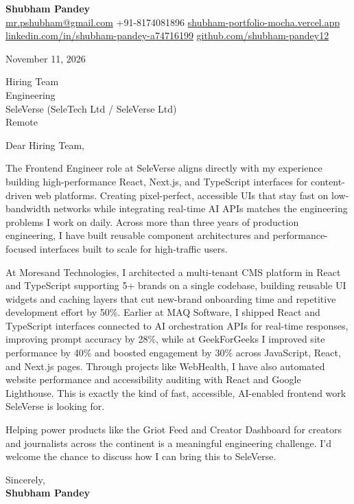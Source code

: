 \documentclass[a4paper,11pt]{article}
\begin{document}
\textbf{\Large Shubham Pandey}\\
\href{mailto:mr.pshubham@gmail.com}{mr.pshubham@gmail.com} \quad +91-8174081896 \quad
\href{https://shubham-portfolio-mocha.vercel.app/}{shubham-portfolio-mocha.vercel.app}\\
\href{https://www.linkedin.com/in/shubham-pandey-a74716199/}{linkedin.com/in/shubham-pandey-a74716199} \quad
\href{https://github.com/shubham-pandey12}{github.com/shubham-pandey12}

\vspace{1em}
November 11, 2026

\vspace{1em}
Hiring Team\\
Engineering\\
SeleVerse (SeleTech Ltd / SeleVerse Ltd)\\
Remote

\vspace{1em}
Dear Hiring Team,

The Frontend Engineer role at SeleVerse aligns directly with my experience building high-performance React, Next.js, and TypeScript interfaces for content-driven web platforms. Creating pixel-perfect, accessible UIs that stay fast on low-bandwidth networks while integrating real-time AI APIs matches the engineering problems I work on daily. Across more than three years of production engineering, I have built reusable component architectures and performance-focused interfaces built to scale for high-traffic users.

At Moresand Technologies, I architected a multi-tenant CMS platform in React and TypeScript supporting 5+ brands on a single codebase, building reusable UI widgets and caching layers that cut new-brand onboarding time and repetitive development effort by 50\%. Earlier at MAQ Software, I shipped React and TypeScript interfaces connected to AI orchestration APIs for real-time responses, improving prompt accuracy by 28\%, while at GeekForGeeks I improved site performance by 40\% and boosted engagement by 30\% across JavaScript, React, and Next.js pages. Through projects like WebHealth, I have also automated website performance and accessibility auditing with React and Google Lighthouse. This is exactly the kind of fast, accessible, AI-enabled frontend work SeleVerse is looking for.

Helping power products like the Griot Feed and Creator Dashboard for creators and journalists across the continent is a meaningful engineering challenge. I'd welcome the chance to discuss how I can bring this to SeleVerse.

\vspace{1em}
Sincerely,\\[0.5em]
\textbf{Shubham Pandey}
\end{document}
